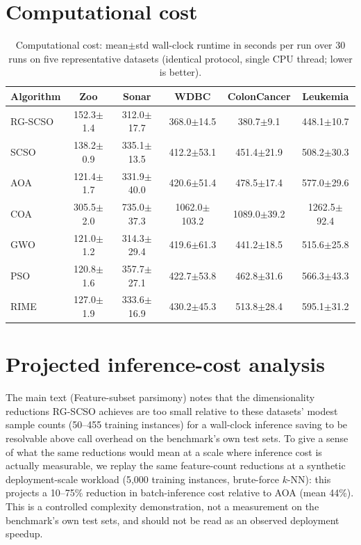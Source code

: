\documentclass[9pt]{article}
\begin{document}
\section{Computational cost}
\begin{table}[t]
\centering
\caption{Computational cost: mean$\pm$std wall-clock runtime in seconds per run over 30 runs on five representative datasets (identical protocol, single CPU thread; lower is better).}
\label{tab:runtime}
\footnotesize
\setlength{\tabcolsep}{4pt}
\begin{tabular}{lccccc}
\toprule
Algorithm & Zoo & Sonar & WDBC & ColonCancer & Leukemia \\
\midrule
RG-SCSO & 152.3$\pm$1.4 & 312.0$\pm$17.7 & 368.0$\pm$14.5 & 380.7$\pm$9.1 & 448.1$\pm$10.7 \\
SCSO & 138.2$\pm$0.9 & 335.1$\pm$13.5 & 412.2$\pm$53.1 & 451.4$\pm$21.9 & 508.2$\pm$30.3 \\
AOA & 121.4$\pm$1.7 & 331.9$\pm$40.0 & 420.6$\pm$51.4 & 478.5$\pm$17.4 & 577.0$\pm$29.6 \\
COA & 305.5$\pm$2.0 & 735.0$\pm$37.3 & 1062.0$\pm$103.2 & 1089.0$\pm$39.2 & 1262.5$\pm$92.4 \\
GWO & 121.0$\pm$1.2 & 314.3$\pm$29.4 & 419.6$\pm$61.3 & 441.2$\pm$18.5 & 515.6$\pm$25.8 \\
PSO & 120.8$\pm$1.6 & 357.7$\pm$27.1 & 422.7$\pm$53.8 & 462.8$\pm$31.6 & 566.3$\pm$43.3 \\
RIME & 127.0$\pm$1.9 & 333.6$\pm$16.9 & 430.2$\pm$45.3 & 513.8$\pm$28.4 & 595.1$\pm$31.2 \\
\bottomrule
\end{tabular}
\end{table}


\FloatBarrier
\section{{Projected inference-cost analysis}}
The main text (Feature-subset parsimony) notes that the dimensionality reductions RG-SCSO achieves are too small relative to these datasets' modest sample counts (50--455 training instances) for a wall-clock inference saving to be resolvable above call overhead on the benchmark's own test sets. To give a sense of what the same reductions would mean at a scale where inference cost is actually measurable, we replay the same feature-count reductions at a synthetic deployment-scale workload (5{,}000 training instances, brute-force $k$-NN): this projects a 10--75\% reduction in batch-inference cost relative to AOA (mean 44\%). This is a controlled complexity demonstration, not a measurement on the benchmark's own test sets, and should not be read as an observed deployment speedup.
\end{document}
